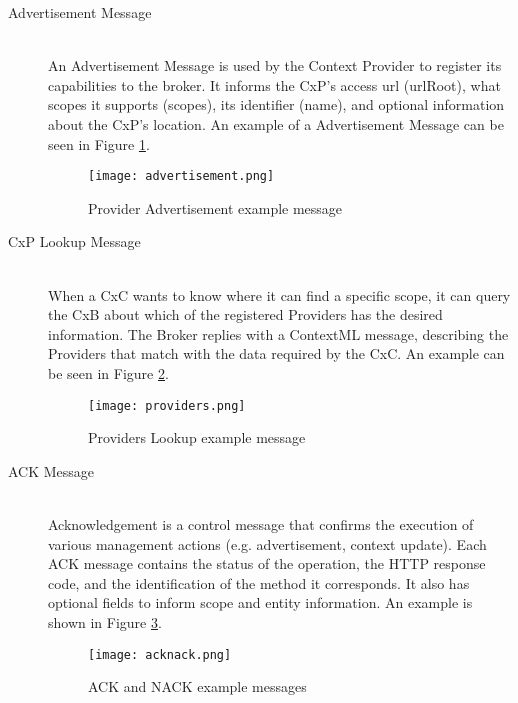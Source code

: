 \begin{description}
\item[Advertisement Message]\hfill \\
An Advertisement Message is used by the Context Provider to register its capabilities to the broker. It informs the CxP’s access url (urlRoot), what scopes it supports (scopes), its identifier (name), and optional information about the CxP’s location. An example of a Advertisement Message can be seen in Figure \ref{fig:advertisement}.

\begin{figure}[H]
	\centering
	\texttt{[image: advertisement.png]}
	\caption{Provider Advertisement example message}
	\label{fig:advertisement}
	
\end{figure}

\item[CxP Lookup Message]\hfill \\
When a CxC wants to know where it can find a specific scope, it can query the CxB about which of the registered Providers has the desired information. The Broker replies with a ContextML message, describing the Providers that match with the data required by the CxC. An example can be seen in Figure \ref{fig:providers}.

\begin{figure}[H]
	\centering
	\texttt{[image: providers.png]}
	\caption{Providers Lookup example message}
	\label{fig:providers}
	
\end{figure}

\item[ACK Message]\hfill \\
Acknowledgement is a control message that confirms the execution of various management actions (e.g. advertisement, context update). Each ACK message contains the status of the operation, the HTTP response code, and the identification of the method it corresponds. It also has optional fields to inform scope and entity information. An example is shown in Figure \ref{fig:acknack}.

\begin{figure}[h]
	\centering
	\texttt{[image: acknack.png]}
	\caption{ACK and NACK example messages}
	\label{fig:acknack}
	
\end{figure}



\end{description}
